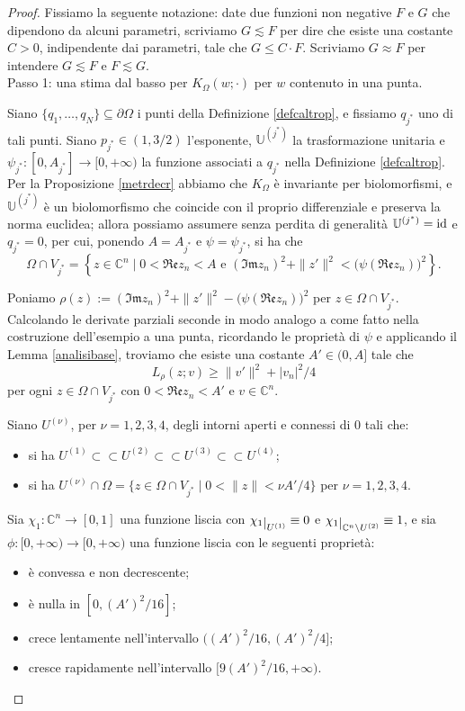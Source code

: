 \begin{proof}
    Fissiamo la seguente notazione: date due funzioni non negative $F$ e $G$ che dipendono da alcuni parametri, scriviamo $G\lesssim F$ per dire che esiste una costante $C>0$, indipendente dai parametri, tale che $G\le C\cdot F$. Scriviamo $G\approx F$ per intendere $G\lesssim F$ e $F\lesssim G$.\\

    Passo 1: una stima dal basso per $K_\Omega(w;\cdot)$ per $w$ contenuto in una punta.

    Siano $\{q_1,\dots,q_N\}\subseteq\partial\Omega$ i punti della Definizione \ref{defcaltrop}, e fissiamo $q_{j^*}$ uno di tali punti. Siano $p_{j^*}\in(1,3/2)$ l'esponente, $\mathbb{U}^{(j^*)}$ la trasformazione unitaria e $\psi_{j^*}:[0,A_{j^*}]\longrightarrow[0,+\infty)$ la funzione associati a $q_{j^*}$ nella Definizione \ref{defcaltrop}. Per la Proposizione \ref{metrdecr} abbiamo che $K_\Omega$ è invariante per biolomorfismi, e $\mathbb{U}^{(j^*)}$ è un biolomorfismo che coincide con il proprio differenziale e preserva la norma euclidea; allora possiamo assumere senza perdita di generalità $\mathbb{U}^{(j^*)}=\operatorname{id}$ e $q_{j^*}=0$, per cui, ponendo $A=A_{j^*}$ e $\psi=\psi_{j^*}$, si ha che
    $$\Omega\cap V_{j^*}=\left\{z\in\mathbb{C}^n\mid 0<\mathfrak{Re}z_n<A\text{ e }(\mathfrak{Im}z_n)^2+\|z'\|^2<\big(\psi(\mathfrak{Re}z_n)\big)^2\right\}.$$

    Poniamo $\rho(z):=(\mathfrak{Im}z_n)^2+\|z'\|^2-\big(\psi(\mathfrak{Re}z_n)\big)^2$ per $z\in\Omega\cap V_{j^*}$. Calcolando le derivate parziali seconde in modo analogo a come fatto nella costruzione dell'esempio a una punta, ricordando le proprietà di $\psi$ e applicando il Lemma \ref{analisibase}, troviamo che esiste una costante $A'\in(0,A]$ tale che
    $$L_\rho(z;v) \ge \|v'\|^2+|v_n|^2/4$$
    per ogni $z\in\Omega\cap V_{j^*}$ con $0<\mathfrak{Re}z_n<A'$ e $v\in\mathbb{C}^n$.

    Siano $U^{(\nu)}$, per $\nu=1,2,3,4$, degli intorni aperti e connessi di $0$ tali che:
    \begin{itemize}
        \item si ha $U^{(1)}\subset\subset U^{(2)}\subset\subset U^{(3)}\subset\subset U^{(4)}$;
        \item si ha $U^{(\nu)}\cap\Omega=\{z\in\Omega\cap V_{j^*}\mid0<\|z\|<\nu A'/4\}$ per $\nu=1,2,3,4$.
    \end{itemize}

    Sia $\chi_1:\mathbb{C}^n\longrightarrow[0,1]$ una funzione liscia con $\chi_1\restrict{U^{(1)}}\equiv 0$ e $\chi_1\restrict{\mathbb{C}^n\setminus U^{(2)}}\equiv 1$, e sia $\phi:[0,+\infty)\longrightarrow[0,+\infty)$ una funzione liscia con le seguenti proprietà:
    \begin{itemize}
        \item è convessa e non decrescente;
        \item è nulla in $[0,(A')^2/16]$;
        \item crece lentamente nell'intervallo $((A')^2/16,(A')^2/4]$;
        \item cresce rapidamente nell'intervallo $[9(A')^2/16,+\infty)$.
    \end{itemize}


\end{proof}
